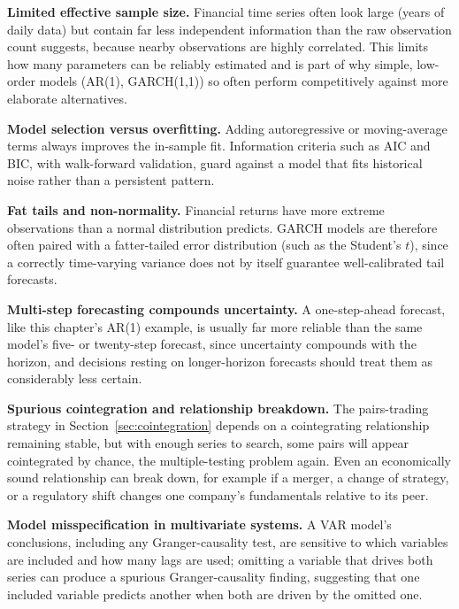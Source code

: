 \documentclass[../ai_in_finance]{subfiles}
\begin{document}
\textbf{Limited effective sample size.} Financial time series often look large (years of daily data) but contain far less independent information than the raw observation count suggests, because nearby observations are highly correlated. This limits how many parameters can be reliably estimated and is part of why simple, low-order models (AR(1), GARCH(1,1)) so often perform competitively against more elaborate alternatives.

\textbf{Model selection versus overfitting.} Adding autoregressive or moving-average terms always improves the in-sample fit. Information criteria such as AIC and BIC, with walk-forward validation, guard against a model that fits historical noise rather than a persistent pattern.

\textbf{Fat tails and non-normality.} Financial returns have more extreme observations than a normal distribution predicts. GARCH models are therefore often paired with a fatter-tailed error distribution (such as the Student's $t$), since a correctly time-varying variance does not by itself guarantee well-calibrated tail forecasts.

\textbf{Multi-step forecasting compounds uncertainty.} A one-step-ahead forecast, like this chapter's AR(1) example, is usually far more reliable than the same model's five- or twenty-step forecast, since uncertainty compounds with the horizon, and decisions resting on longer-horizon forecasts should treat them as considerably less certain.

\textbf{Spurious cointegration and relationship breakdown.} The pairs-trading strategy in Section~\ref{sec:cointegration} depends on a cointegrating relationship remaining stable, but with enough series to search, some pairs will appear cointegrated by chance, the multiple-testing problem again. Even an economically sound relationship can break down, for example if a merger, a change of strategy, or a regulatory shift changes one company's fundamentals relative to its peer.

\textbf{Model misspecification in multivariate systems.} A VAR model's conclusions, including any Granger-causality test, are sensitive to which variables are included and how many lags are used; omitting a variable that drives both series can produce a spurious Granger-causality finding, suggesting that one included variable predicts another when both are driven by the omitted one.
\end{document}
